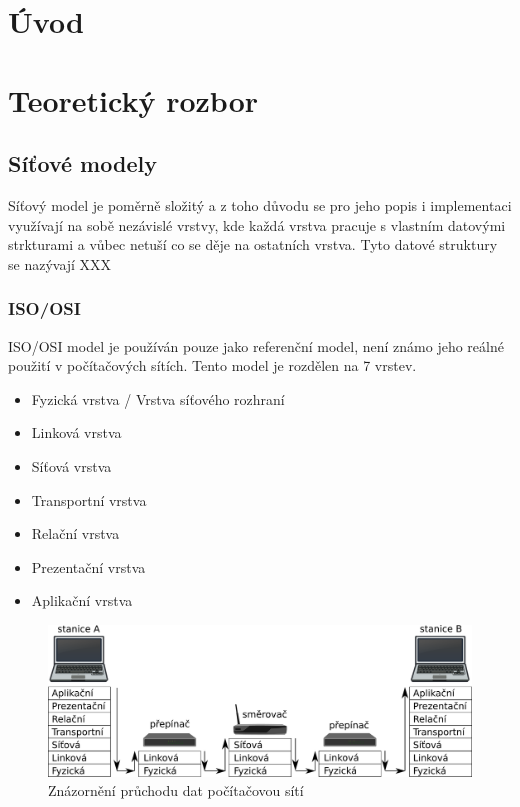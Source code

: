 
\chapter{Úvod}

\chapter{Teoretický rozbor}
\section{Síťové modely}

Síťový model je poměrně složitý a z toho důvodu se pro jeho popis i implementaci využívají na sobě nezávislé vrstvy, kde každá vrstva pracuje s vlastním datovými strkturami a vůbec netuší co se děje na ostatních vrstva.
Tyto datové struktury se nazývají XXX


\subsection{ISO/OSI}
ISO/OSI model je používán pouze jako referenční model, není známo jeho reálné použití v počítačových sítích.
Tento model je rozdělen na 7 vrstev.

\begin{itemize}
\item{Fyzická vrstva / Vrstva síťového rozhraní}
\item{Linková vrstva}
\item{Síťová vrstva}
\item{Transportní vrstva}
\item{Relační vrstva}
\item{Prezentační vrstva}
\item{Aplikační vrstva}
\end{itemize}

\begin{figure}[!htb]
\centering
\includegraphics[scale=.25]{fig/layers.pdf}
\caption{Znázornění průchodu dat počítačovou sítí}
\label{fig:layers}
\end{figure}

